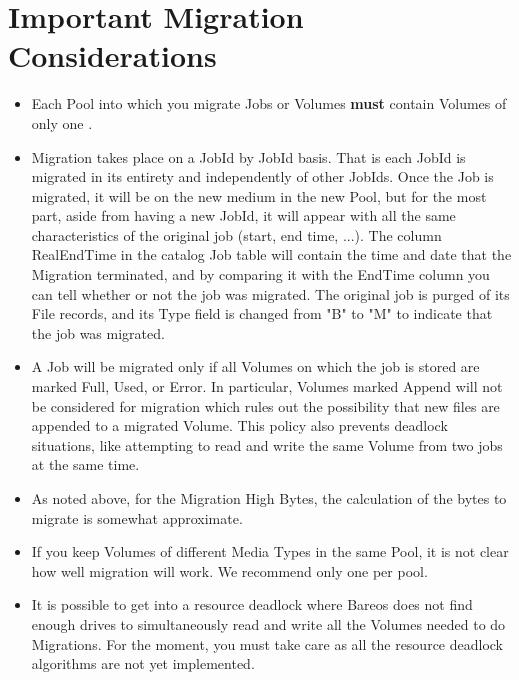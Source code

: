 \section{Important Migration Considerations}
\begin{itemize}
\item Each Pool into which you migrate Jobs or Volumes {\bf must}
      contain Volumes of only one .

\item Migration takes place on a JobId by JobId basis. That is
      each JobId is migrated in its entirety and independently
      of other JobIds. Once the Job is migrated, it will be
      on the new medium in the new Pool, but for the most part,
      aside from having a new JobId, it will appear with all the
      same characteristics of the original job (start, end time, ...).
      The column RealEndTime in the catalog Job table will contain the
      time and date that the Migration terminated, and by comparing
      it with the EndTime column you can tell whether or not the
      job was migrated.  The original job is purged of its File
      records, and its Type field is changed from "B" to "M" to
      indicate that the job was migrated.

\item A Job will be migrated only if all Volumes on which the job
      is stored are marked Full, Used, or Error. In particular, Volumes
      marked Append will not be considered for migration which rules out
      the possibility that new files are appended to a migrated Volume.
      This policy also prevents deadlock situations, like attempting to
      read and write the same Volume from two jobs at the same time.

\item As noted above, for the Migration High Bytes, the calculation
      of the bytes to migrate is somewhat approximate.

\item If you keep Volumes of different Media Types in the same Pool,
      it is not clear how well migration will work.  We recommend only
      one  per pool.

\item It is possible to get into a resource deadlock where Bareos does
      not find enough drives to simultaneously read and write all the
      Volumes needed to do Migrations. For the moment, you must take
      care as all the resource deadlock algorithms are not yet implemented.


\end{itemize}
